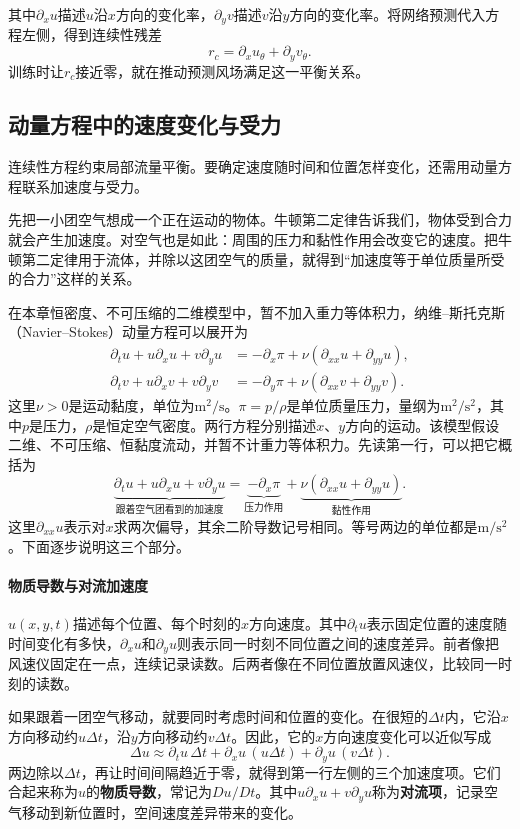 其中$\partial_xu$描述$u$沿$x$方向的变化率，$\partial_yv$描述$v$沿$y$方向的变化率。将网络预测代入方程左侧，得到连续性残差
\[
 r_c=\partial_xu_\theta+\partial_yv_\theta.
\]
训练时让$r_c$接近零，就在推动预测风场满足这一平衡关系。

\subsection{动量方程中的速度变化与受力}
连续性方程约束局部流量平衡。要确定速度随时间和位置怎样变化，还需用动量方程联系加速度与受力。

先把一小团空气想成一个正在运动的物体。牛顿第二定律告诉我们，物体受到合力就会产生加速度。对空气也是如此：周围的压力和黏性作用会改变它的速度。把牛顿第二定律用于流体，并除以这团空气的质量，就得到“加速度等于单位质量所受的合力”这样的关系。

在本章恒密度、不可压缩的二维模型中，暂不加入重力等体积力，纳维--斯托克斯（Navier--Stokes）动量方程可以展开为
\begin{align}
 \partial_tu+u\partial_xu+v\partial_yu
 &=-\partial_x\pi+\nu(\partial_{xx}u+\partial_{yy}u),\\
 \partial_tv+u\partial_xv+v\partial_yv
 &=-\partial_y\pi+\nu(\partial_{xx}v+\partial_{yy}v).
 \label{eq:pinn-momentum}
\end{align}
这里$\nu>0$是运动黏度，单位为$\mathrm{m^2/s}$。$\pi=p/\rho$是单位质量压力，量纲为$\mathrm{m^2/s^2}$，其中$p$是压力，$\rho$是恒定空气密度。两行方程分别描述$x$、$y$方向的运动。该模型假设二维、不可压缩、恒黏度流动，并暂不计重力等体积力。先读第一行，可以把它概括为
\[
 \underbrace{\partial_tu+u\partial_xu+v\partial_yu}_{\text{跟着空气团看到的加速度}}
 =\underbrace{-\partial_x\pi}_{\text{压力作用}}
 +\underbrace{\nu(\partial_{xx}u+\partial_{yy}u)}_{\text{黏性作用}}.
\]
这里$\partial_{xx}u$表示对$x$求两次偏导，其余二阶导数记号相同。等号两边的单位都是$\mathrm{m/s^2}$。下面逐步说明这三个部分。

\paragraph{物质导数与对流加速度}
$u(x,y,t)$描述每个位置、每个时刻的$x$方向速度。其中$\partial_tu$表示固定位置的速度随时间变化有多快，$\partial_xu$和$\partial_yu$则表示同一时刻不同位置之间的速度差异。前者像把风速仪固定在一点，连续记录读数。后两者像在不同位置放置风速仪，比较同一时刻的读数。

如果跟着一团空气移动，就要同时考虑时间和位置的变化。在很短的$\Delta t$内，它沿$x$方向移动约$u\Delta t$，沿$y$方向移动约$v\Delta t$。因此，它的$x$方向速度变化可以近似写成
\[
 \Delta u\approx\partial_tu\,\Delta t
 +\partial_xu\,(u\Delta t)+\partial_yu\,(v\Delta t).
\]
两边除以$\Delta t$，再让时间间隔趋近于零，就得到第一行左侧的三个加速度项。它们合起来称为$u$的\textbf{物质导数}，常记为$Du/Dt$。其中$u\partial_xu+v\partial_yu$称为\textbf{对流项}，记录空气移动到新位置时，空间速度差异带来的变化。

